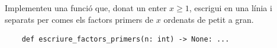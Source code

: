 

\Statement

Implementeu una funció que, donat un enter $x\ge 1$, escrigui en una línia i separats per comes els factors primers de $x$ ordenats de petit a gran.

\lstset{language=Python}
\begin{lstlisting}
    def escriure_factors_primers(n: int) -> None: ...
\end{lstlisting}
\medskip

\ObservationNoMain
